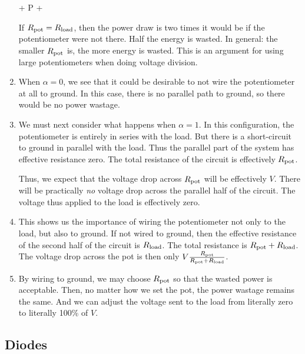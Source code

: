 \documentclass[11pt, oneside]{amsart}
\begin{document}
\begin{enumerate}
  \begin{nedqn}
  \eqcol
     + 
    P
  \eqcol
     + 
  \end{nedqn}

  If $R_\text{pot} = R_\text{load}$, then the power draw is two times it would be
  if the potentiometer were not there. Half the energy is wasted. In
  general: the smaller $R_\text{pot}$ is, the more energy is wasted. This is an
  argument for using large potentiometers when doing voltage division.

  \item When $\alpha = 0$, we see that it could be desirable to not wire
  the potentiometer at all to ground. In this case, there is no parallel
  path to ground, so there would be no power wastage.

  \item We must next consider what happens when $\alpha = 1$. In this
  configuration, the potentiometer is entirely in series with the load.
  But there is a short-circuit to ground in parallel with the load. Thus
  the parallel part of the system has effective resistance zero. The
  total resistance of the circuit is effectively $R_\text{pot}$.

  Thus, we expect that the voltage drop across $R_\text{pot}$ will be
  effectively $V$. There will be practically \emph{no} voltage drop
  across the parallel half of the circuit. The voltage thus applied to
  the load is effectively zero.

  \item This shows us the importance of wiring the potentiometer not
  only to the load, but also to ground. If not wired to ground, then the
  effective resistance of the second half of the circuit is $R_\text{load}$.
  The total resistance is $R_\text{pot} + R_\text{load}$. The voltage drop across the
  pot is then only $V \frac{R_\text{pot}}{R_\text{pot} + R_\text{load}}$.

  \item By wiring to ground, we may choose $R_\text{pot}$ so that the wasted
  power is acceptable. Then, no matter how we set the pot, the power
  wastage remains the same. And we can adjust the voltage sent to the
  load from literally zero to literally 100\% of $V$.
\end{enumerate}

\subsection{Diodes}
\end{document}
